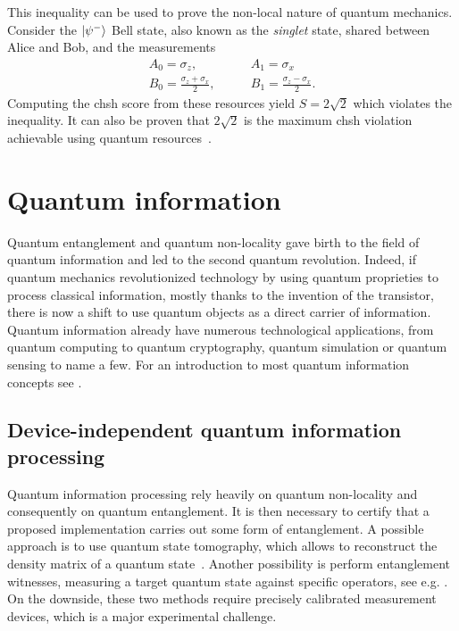 \medbreak

This inequality can be used to prove the non-local nature of quantum mechanics. 
Consider the $\ket{\psi^-}$ Bell state, also known as the \textit{singlet} state, shared between Alice and Bob, and the measurements
\begin{equation}
	\begin{split}
		A_0 = \sigma_z, \quad & \quad A_1 = \sigma_x \\
		B_0 = \frac{\sigma_z+\sigma_x}{2}, \quad &\quad B_1 = \frac{\sigma_z - \sigma_x}{2}.
		\label{eq:CHSH_measurement}
	\end{split}
\end{equation}
Computing the \acrshort{chsh} score from these resources yield $S=2\sqrt{2}$ which violates the inequality.
It can also be proven that $2\sqrt{2}$ is the maximum \acrshort{chsh} violation achievable using quantum resources~\cite{Tsirelson1980}.

\chapter{Quantum information}
\label{chapter:quantumInfo}

Quantum entanglement and quantum non-locality gave birth to the field of quantum information and led to the second quantum revolution.
Indeed, if quantum mechanics revolutionized technology by using quantum proprieties to process classical information, mostly thanks to the invention of the transistor, there is now a shift to use quantum objects as a direct carrier of information.
Quantum information already have numerous technological applications, from quantum computing to quantum cryptography, quantum simulation or quantum sensing to name a few.
For an introduction to most quantum information concepts see \cite{Nielsen2012}.

\section{Device-independent quantum information processing}

Quantum information processing rely heavily on quantum non-locality and consequently on quantum entanglement.
It is then necessary to certify that a proposed implementation carries out some form of entanglement.
A possible approach is to use quantum state tomography, which allows to reconstruct the density matrix of a quantum state~\cite{MauroDAriano2003}.
Another possibility is perform entanglement witnesses, measuring a target quantum state against specific operators, see e.g. \cite{Bru2002}.
On the downside, these two methods require precisely calibrated measurement devices, which is a major experimental challenge.

